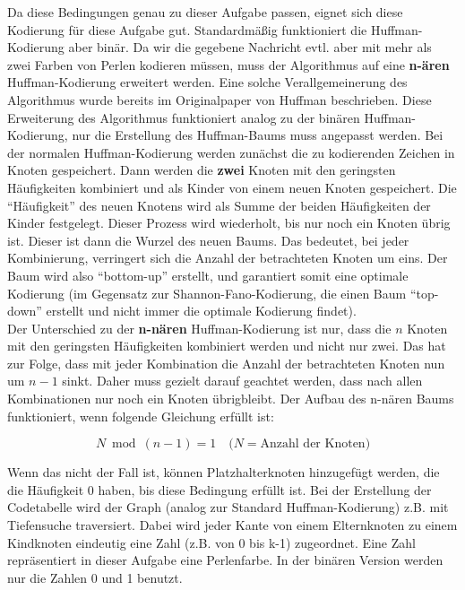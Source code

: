 \documentclass[a4paper,10pt,ngerman]{scrartcl}
\begin{document}
Da diese Bedingungen genau zu dieser Aufgabe passen, eignet sich diese Kodierung für diese Aufgabe gut. Standardmäßig funktioniert die Huffman-Kodierung aber binär. Da wir die gegebene Nachricht evtl. aber mit mehr als zwei Farben von Perlen kodieren müssen, muss der Algorithmus auf eine \textbf{n-ären} Huffman-Kodierung erweitert werden. Eine solche Verallgemeinerung des Algorithmus wurde bereits im Originalpaper von Huffman \cite{paperhuffman} beschrieben.
\newline
Diese Erweiterung des Algorithmus funktioniert analog zu der binären Huffman-Kodierung, nur die Erstellung des Huffman-Baums muss angepasst werden. Bei der normalen Huffman-Kodierung werden zunächst die zu kodierenden Zeichen in Knoten gespeichert.
Dann werden die \textbf{zwei} Knoten mit den geringsten Häufigkeiten kombiniert und als Kinder von einem neuen Knoten gespeichert. Die “Häufigkeit” des neuen Knotens wird als Summe der beiden Häufigkeiten der Kinder festgelegt. Dieser Prozess wird wiederholt, bis nur noch ein Knoten übrig ist. Dieser ist dann die Wurzel des neuen Baums. Das bedeutet, bei jeder Kombinierung, verringert sich die Anzahl der betrachteten Knoten um eins. Der Baum wird also “bottom-up” erstellt, und garantiert somit eine optimale Kodierung (im Gegensatz zur Shannon-Fano-Kodierung, die einen Baum “top-down” erstellt und nicht immer die optimale Kodierung findet).  \\
\newline
Der Unterschied zu der \textbf{n-nären} Huffman-Kodierung ist nur, dass die $n$ Knoten mit den geringsten Häufigkeiten kombiniert werden und nicht nur zwei. Das hat zur Folge, dass mit jeder Kombination die Anzahl der betrachteten Knoten nun um $n-1$ sinkt. Daher muss gezielt darauf geachtet werden, dass nach allen Kombinationen nur noch ein Knoten übrigbleibt. Der Aufbau des n-nären Baums funktioniert, wenn folgende Gleichung erfüllt ist: 

\begin{equation}
N \bmod (n - 1) = 1 \quad \text{(}N = \text{Anzahl der Knoten}\text{)}
\label{eq:1}
\end{equation}

Wenn das nicht der Fall ist, können Platzhalterknoten hinzugefügt werden, die die Häufigkeit 0 haben, bis diese Bedingung erfüllt ist. 
Bei der Erstellung der Codetabelle wird der Graph (analog zur Standard Huffman-Kodierung) z.B. mit Tiefensuche traversiert. Dabei wird jeder Kante von einem Elternknoten zu einem Kindknoten eindeutig eine Zahl (z.B. von 0 bis k-1) zugeordnet. Eine Zahl repräsentiert in dieser Aufgabe eine Perlenfarbe. In der binären Version werden nur die Zahlen 0 und 1 benutzt. 
\end{document}
